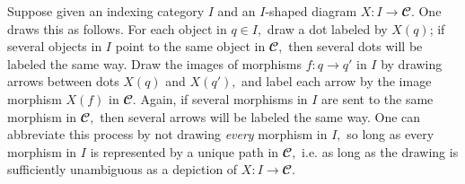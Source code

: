 \documentclass[../main/CT4S-EN-RU]{subfiles}
\begin{document}
\begin{definitionRUS}
\end{definitionRUS}

\begin{blockENG}
Suppose given an indexing category $I$ and an $I$-shaped diagram $X\colon I{→}{𝓒}.$ One draws this as follows. For each object in $q\in I,$ draw a dot labeled by $X(q)$; if several objects in $I$ point to the same object in ${𝓒},$ then several dots will be labeled the same way. Draw the images of morphisms $f\colon q{→} q'$ in $I$ by drawing arrows between dots $X(q)$ and $X(q'),$ and label each arrow by the image morphism $X(f)$ in ${𝓒}.$ Again, if several morphisms in $I$ are sent to the same morphism in ${𝓒},$ then several arrows will be labeled the same way. One can abbreviate this process by not drawing {\em every} morphism in $I,$ so long as every morphism in $I$ is represented by a unique path in ${𝓒},$ i.e. as long as the drawing is sufficiently unambiguous as a depiction of $X\colon I{→}{𝓒}.$
\end{blockENG}

\begin{blockRUS}
\end{blockRUS}
\end{document}
